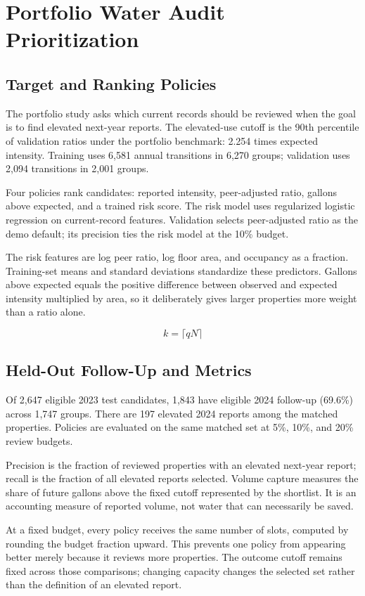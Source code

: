 \documentclass[12pt,a4paper]{article}
\begin{document}
\newpage
\section{Portfolio Water Audit Prioritization}
\subsection{Target and Ranking Policies}
The portfolio study asks which current records should be reviewed when the goal is to find elevated next-year reports. The elevated-use cutoff is the 90th percentile of validation ratios under the portfolio benchmark: 2.254 times expected intensity. Training uses 6,581 annual transitions in 6,270 groups; validation uses 2,094 transitions in 2,001 groups.

Four policies rank candidates: reported intensity, peer-adjusted ratio, gallons above expected, and a trained risk score. The risk model uses regularized logistic regression on current-record features. Validation selects peer-adjusted ratio as the demo default; its precision ties the risk model at the 10\% budget.

The risk features are log peer ratio, log floor area, and occupancy as a fraction. Training-set means and standard deviations standardize these predictors. Gallons above expected equals the positive difference between observed and expected intensity multiplied by area, so it deliberately gives larger properties more weight than a ratio alone.

\[k=\lceil qN\rceil\]
\subsection{Held-Out Follow-Up and Metrics}
Of 2,647 eligible 2023 test candidates, 1,843 have eligible 2024 follow-up (69.6\%) across 1,747 groups. There are 197 elevated 2024 reports among the matched properties. Policies are evaluated on the same matched set at 5\%, 10\%, and 20\% review budgets.

Precision is the fraction of reviewed properties with an elevated next-year report; recall is the fraction of all elevated reports selected. Volume capture measures the share of future gallons above the fixed cutoff represented by the shortlist. It is an accounting measure of reported volume, not water that can necessarily be saved.

At a fixed budget, every policy receives the same number of slots, computed by rounding the budget fraction upward. This prevents one policy from appearing better merely because it reviews more properties. The outcome cutoff remains fixed across those comparisons; changing capacity changes the selected set rather than the definition of an elevated report.
\end{document}
